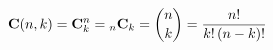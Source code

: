 \documentclass[12pt]{article}
\begin{document}
${ \displaystyle
   \mathbf{C}(n,k) = \mathbf{C}_k^n = {}_n\mathbf{C}_k = \dbinom{n}{k} = \dfrac{n!}{k!\,(n -k)!}
}$
\end{document}
